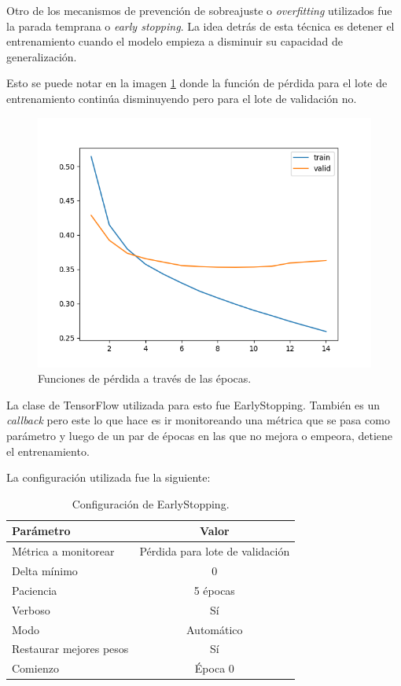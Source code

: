 Otro de los mecanismos de prevención de sobreajuste o \textit{overfitting} utilizados fue la parada temprana o \textit{early stopping}. La idea detrás de esta técnica es detener el entrenamiento cuando el modelo empieza a disminuir su capacidad de generalización.

Esto se puede notar en la imagen \ref{fig:cap3-overfitting} donde la función de pérdida para el lote de entrenamiento continúa disminuyendo pero para el lote de validación no.

\begin{figure}[htbp]
	\centering
	\includegraphics[width=.8\textwidth]{./Figures/cap3-overfitting.png}
	\caption{Funciones de pérdida a través de las épocas.}
	\label{fig:cap3-overfitting}
\end{figure}

La clase de TensorFlow utilizada para esto fue EarlyStopping. También es un \textit{callback} pero este lo que hace es ir monitoreando una métrica que se pasa como parámetro y luego de un par de épocas en las que no mejora o empeora, detiene el entrenamiento.

La configuración utilizada fue la siguiente:
\begin{table}[h]
	\centering
	\caption[Configuración EarlyStopping]{Configuración de EarlyStopping.}
	\begin{tabular}{l c}    
		\toprule
		\textbf{Parámetro}			& 			\textbf{Valor}  \\
		\midrule
		Métrica a monitorear		& 			Pérdida para lote de validación  \\
		Delta mínimo				& 			0 \\
		Paciencia					& 			5 épocas  \\
		Verboso						& 			Sí  \\
		Modo						& 			Automático  \\	
		Restaurar mejores pesos 	& 			Sí  \\
		Comienzo					& 			Época 0  \\	
		\bottomrule
		\hline
	\end{tabular}
	\label{tab:earlystopping}
\end{table}

